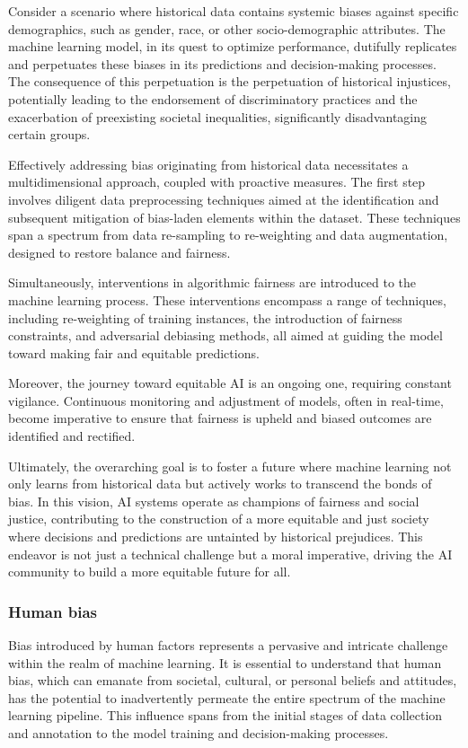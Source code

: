 \documentclass[12pt,a4paper,openright,twoside]{book}
\begin{document}
Consider a scenario where historical data contains systemic biases against specific demographics, such as gender, race, or other socio-demographic attributes. The machine learning model, in its quest to optimize performance, dutifully replicates and perpetuates these biases in its predictions and decision-making processes. The consequence of this perpetuation is the perpetuation of historical injustices, potentially leading to the endorsement of discriminatory practices and the exacerbation of preexisting societal inequalities, significantly disadvantaging certain groups. 

Effectively addressing bias originating from historical data necessitates a multidimensional approach, coupled with proactive measures. The first step involves diligent data preprocessing techniques aimed at the identification and subsequent mitigation of bias-laden elements within the dataset. These techniques span a spectrum from data re-sampling to re-weighting and data augmentation, designed to restore balance and fairness. 

Simultaneously, interventions in algorithmic fairness are introduced to the machine learning process. These interventions encompass a range of techniques, including re-weighting of training instances, the introduction of fairness constraints, and adversarial debiasing methods, all aimed at guiding the model toward making fair and equitable predictions. 

Moreover, the journey toward equitable AI is an ongoing one, requiring constant vigilance. Continuous monitoring and adjustment of models, often in real-time, become imperative to ensure that fairness is upheld and biased outcomes are identified and rectified. 

Ultimately, the overarching goal is to foster a future where machine learning not only learns from historical data but actively works to transcend the bonds of bias. In this vision, AI systems operate as champions of fairness and social justice, contributing to the construction of a more equitable and just society where decisions and predictions are untainted by historical prejudices. This endeavor is not just a technical challenge but a moral imperative, driving the AI community to build a more equitable future for all.

\subsubsection{Human bias}
Bias introduced by human factors represents a pervasive and intricate challenge within the realm of machine learning. It is essential to understand that human bias, which can emanate from societal, cultural, or personal beliefs and attitudes, has the potential to inadvertently permeate the entire spectrum of the machine learning pipeline. This influence spans from the initial stages of data collection and annotation to the model training and decision-making processes. 
\end{document}
